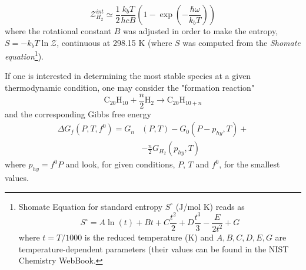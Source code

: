 \documentclass[a4paper, 11pt, twoside]{book}
\begin{document}
\begin{equation}
    \mathcal{Z}^{int}_{H_2} \simeq \frac{1}{2}\frac{k_bT}{hcB}\left(1-\exp\left(-\frac{\hbar\omega}{k_bT}\right)\right)
\end{equation}
where the rotational constant $B$ was adjusted in order to make the entropy, $S=-k_bT\ln{\mathcal{Z}}$, continuous at 298.15 K (where $S$ was computed from the \emph{Shomate equation}\footnote{
Shomate Equation for standard entropy $S^{\circ}$ (J/mol K) reads as
\begin{equation*}
S^{\circ} = A \ln{(t)} + Bt + C\frac{t^2}{2} + D\frac{t^3}{3} - \frac{E}{2t^2} + G
\end{equation*}
where $t=T/1000$ is the reduced temperature (K) and $A,B,C,D,E,G$ are temperature-dependent parameters (their values can be found in the NIST Chemistry WebBook.}).

If one is interested in determining the most stable species at a given thermodynamic condition, one may consider the "formation reaction"
\begin{equation}
    \text{C}_{20}\text{H}_{10} + \frac{n}{2}\text{H}_{2} \rightarrow \text{C}_{20}\text{H}_{10+n} \nonumber
\end{equation}
and the corresponding Gibbs free energy 
\begin{align}
    \Delta G_f(P,T,f^0) = G_n&(P,T)-G_0(P-p_{hy},T)+ \nonumber \\
     &-\frac{n}{2}G_{H_2}(p_{hy},T) \nonumber 
\end{align}
where $p_{hy}=f^0P$ and look, for given conditions, $P$, $T$ and $f^0$, for the smallest values. 
\end{document}
